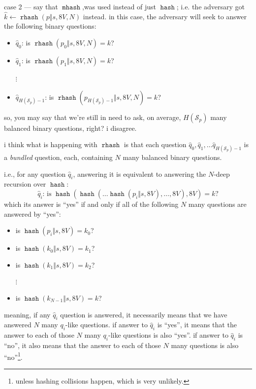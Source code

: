 \documentclass[twocolumn]{article}
\DeclareMathOperator{\hash}{\mathtt{hash}}
\DeclareMathOperator{\rhash}{\mathtt{rhash}}
\DeclareMathOperator{\mhash}{\mathtt{mhash}}
\begin{document}
case 2 --- say that $\mhash$,was used instead of just $\hash$;  i.e. the
adversary got $\hat k \gets \rhash(p \Vert s, 8V, N)$ instead.  in this
case, the adversary will seek to answer the following binary questions:
\begin{itemize}
    \item $\hat q_0$: is $\rhash(p_0 \Vert s, 8V, N) = k$?
    \item $\hat q_1$: is $\rhash(p_1 \Vert s, 8V, N) = k$?

    $\vdots$

    \item $\hat q_{H(\mathcal{S}_p)-1}$: is $\rhash(p_{H(\mathcal{S}_p)-1}
    \Vert s, 8V, N) = k$?
\end{itemize}

so, you may say that we're still in need to ask, on average,
$H(\mathcal{S}_p)$ many balanced binary questions, right?  i disagree.

i think what is happening with $\rhash$ is that each question $\hat q_0,
\hat q_1, \ldots \hat q_{H(\mathcal{S}_p)-1}$ is a \emph{bundled} question,
each, containing $N$ many balanced binary questions.

i.e., for any question $\hat q_i$, answering it is equivalent to answering
the $N$-deep recursion over $\hash$:
\[
    \text{$\hat q_i$: is }\hash(\hash(\ldots\hash(p_i \Vert s, 8V), \ldots,
    8V), 8V) = k \text{?}
\]
which its answer is ``yes'' if and only if all of the following $N$ many
questions are answered by ``yes'':
\begin{itemize}
    \item is $\hash(p_i \Vert s, 8V) = k_0$?
    \item is $\hash(k_0 \Vert s, 8V) = k_1$?
    \item is $\hash(k_1 \Vert s, 8V) = k_2$?

    $\vdots$

    \item is $\hash(k_{N-1} \Vert s, 8V) = k$?
\end{itemize}

meaning, if any $\hat q_i$ question is answered, it necessarily means that
we have answered $N$ many $q_i$-like questions.  if answer to $\hat q_i$ is
``yes'', it means that the answer to each of those $N$ many $q_i$-like
questions is also ``yes''.  if answer to $\hat q_i$ is ``no'', it also
means that the answer to each of those $N$ many questions is also
``no''\footnote{unless hashing collisions happen, which is very unlikely.}.
\end{document}
